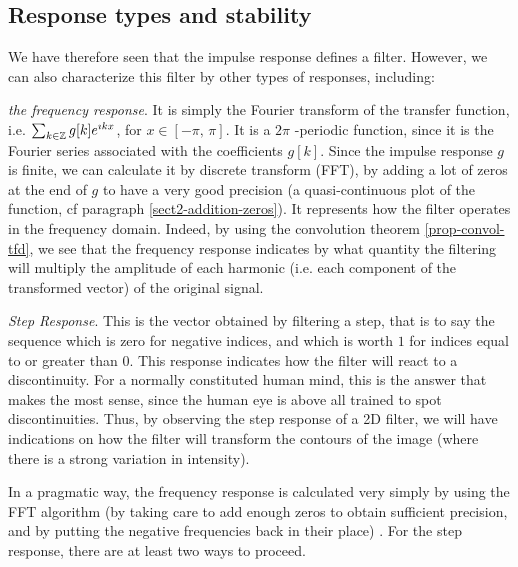 \subsection{Response types and stability}
\label{sect2-responses-stability} 
 
 
We have therefore seen that the impulse response defines a filter. However, we can also characterize this filter by other types of responses, including: \begin{rs}
\item {}  \textit{the frequency response}. It is simply the Fourier transform of the transfer function, i.e. $ \sum_{k \in \mathbb{Z}}{g [k] e^{\imath kx}} $, for $ x \in [- \pi, \, \pi] $. It is a $ 2 \pi $ -periodic function, since it is the Fourier series associated with the coefficients $ g [k] $. Since the impulse response $ g $ is finite, we can calculate it by discrete transform (FFT), by adding a lot of zeros at the end of $ g $ to have a very good precision (a quasi-continuous plot of the function, cf paragraph \ref{sect2-addition-zeros}). It represents how the filter operates in the frequency domain. Indeed, by using the convolution theorem \ref{prop-convol-tfd}, we see that the frequency response indicates by what quantity the filtering will multiply the amplitude of each harmonic (i.e. each component of the transformed vector) of the original signal.
\item {} \textit{Step Response}. This is the vector obtained by filtering a step, that is to say the sequence which is zero for negative indices, and which is worth $ 1 $ for indices equal to or greater than $ 0 $. This response indicates how the filter will react to a discontinuity. For a normally constituted human mind, this is the answer that makes the most sense, since the human eye is above all trained to spot discontinuities. Thus, by observing the step response of a 2D filter, we will have indications on how the filter will transform the contours of the image (where there is a strong variation in intensity).
\end{rs} In a pragmatic way, the frequency response is calculated very simply by using the FFT algorithm (by taking care to add enough zeros to obtain sufficient precision, and by putting the negative frequencies back in their place) . For the step response, there are at least two ways to proceed. \begin{rs}

\end{rs}

